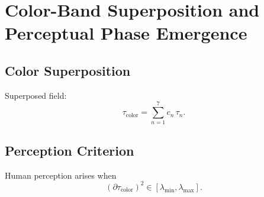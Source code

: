 \chapter{Color-Band Superposition and Perceptual Phase Emergence}

\section{Color Superposition}
Superposed field:
\[
\tau_{\mathrm{color}} = \sum_{n=1}^7 c_n\,\tau_n.
\]

\section{Perception Criterion}
Human perception arises when
\[
(\partial\tau_{\mathrm{color}})^2 \in [\lambda_{\min},\lambda_{\max}].
\]

